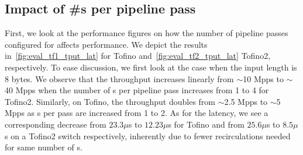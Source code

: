 % 
% 
% 
% 
% 
% 
% 




% 


\subsection{Impact of \#{\pround}s per pipeline pass}

First, we look at the performance figures on how the number of pipeline passes configured for \sysname affects performance.
We depict the results in~\cref{fig:eval_tf1_tput_lat} for Tofino and~\cref{fig:eval_tf2_tput_lat} Tofino2, respectively.
To ease discussion, we first look at the case when the input length is 8 bytes.
We observe that the \sysname throughput increases linearly from ${\sim}$10 Mpps to ${\sim}$40 Mpps when the number of {\pround}s per pipeline pass increases from 1 to 4 for Tofino2. 
Similarly, on Tofino, the throughput doubles from ${\sim}$2.5 Mpps to ${\sim}$5 Mpps as {\pround}s per pass are increased from 1 to 2.
As for the latency, we see a corresponding decrease from $23.3 \mu$s to $12.23 \mu$s for Tofino and from $25.6 \mu$s to $8.5 \mu$s on a Tofino2 switch respectively, inherently due to fewer recirculations needed for same number of {\pround}s.

